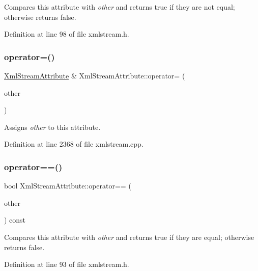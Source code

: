 Compares this attribute with {\itshape other} and returns {\ttfamily true} if they are not equal; otherwise returns {\ttfamily false}. 

Definition at line 98 of file xmlstream.\+h.

\mbox{\label{class_xml_stream_attribute_a7d455c18b5d261f261523752e9d39b98}} 
\subsubsection{\texorpdfstring{operator=()}{operator=()}}
{\footnotesize\ttfamily \hyperlink{class_xml_stream_attribute}{Xml\+Stream\+Attribute} \& Xml\+Stream\+Attribute\+::operator= (\begin{DoxyParamCaption}\item[{const \hyperlink{class_xml_stream_attribute}{Xml\+Stream\+Attribute} \&}]{other }\end{DoxyParamCaption})}

Assigns {\itshape other} to this attribute. 

Definition at line 2368 of file xmlstream.\+cpp.

\mbox{\label{class_xml_stream_attribute_aeb585e0fb002453ec3a176accb119c6a}} 
\subsubsection{\texorpdfstring{operator==()}{operator==()}}
{\footnotesize\ttfamily bool Xml\+Stream\+Attribute\+::operator== (\begin{DoxyParamCaption}\item[{const \hyperlink{class_xml_stream_attribute}{Xml\+Stream\+Attribute} \&}]{other }\end{DoxyParamCaption}) const\hspace{0.3cm}{\ttfamily [inline]}}

Compares this attribute with {\itshape other} and returns {\ttfamily true} if they are equal; otherwise returns {\ttfamily false}. 

Definition at line 93 of file xmlstream.\+h.

